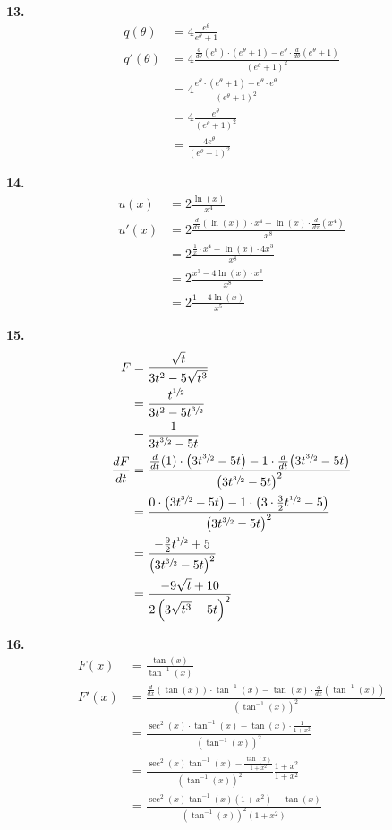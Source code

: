 \documentclass[10pt,oneside,]{book}
\theoremstyle{plain}
\theoremstyle{definition}
\numberwithin{equation}{section}
\newcommand{\fe}[2]{#1\mathopen{}\left(#2\right)\mathclose{}}
\newcommand{\fd}[1]{#1'}
\newcommand{\lz}[2]{\frac{d#1}{d#2}}
\newcommand{\lzoo}[2]{{\frac{d}{d#1}}{\left(#2\right)}}
\begin{document}
\par\smallskip
\noindent\textbf{13.}\quad{}\begin{align*}
\fe{q}{\theta}&=4\frac{e^{\theta}}{e^\theta+1}\\
\fe{\fd{q}}{\theta}&=4\frac{\lzoo{\theta}{e^{\theta}}\cdot\left(e^\theta+1\right)-e^{\theta}\cdot\lzoo{\theta}{e^\theta+1}}{\left(e^\theta+1\right)^2}\\
&=4\frac{e^{\theta}\cdot\left(e^\theta+1\right)-e^{\theta}\cdot e^\theta}{\left(e^\theta+1\right)^2}\\
&=4\frac{e^{\theta}}{\left(e^\theta+1\right)^2}\\
&=\frac{4e^{\theta}}{\left(e^\theta+1\right)^2}
\end{align*}%
\par\smallskip
\noindent\textbf{14.}\quad{}\begin{align*}
\fe{u}{x}&=2\frac{\fe{\ln}{x}}{x^4}\\
\fe{\fd{u}}{x}&=2\frac{\lzoo{x}{\fe{\ln}{x}}\cdot x^4-\fe{\ln}{x}\cdot\lzoo{x}{x^4}}{x^8}\\
&=2\frac{\frac{1}{x}\cdot x^4-\fe{\ln}{x}\cdot4x^3}{x^8}\\
&=2\frac{x^3-4\fe{\ln}{x}\cdot x^3}{x^8}\\
&=2\frac{1-4\fe{\ln}{x}}{x^5}
\end{align*}%
\par\smallskip
\noindent\textbf{15.}\quad{}\begin{align*}
F&=\frac{\sqrt{t}}{3t^2-5\sqrt{t^3}}\\
&=\frac{t^{\sfrac{1}{2}}}{3t^2-5t^{\sfrac{3}{2}}}\\
&=\frac{1}{3t^{\sfrac{3}{2}}-5t}\\
\lz{F}{t}&=\frac{\lzoo{t}{1}\cdot \left(3t^{\sfrac{3}{2}}-5t\right)-1\cdot\lzoo{t}{3t^{\sfrac{3}{2}}-5t}}{\left(3t^{\sfrac{3}{2}}-5t\right)^2}\\
&=\frac{0\cdot \left(3t^{\sfrac{3}{2}}-5t\right)-1\cdot\left(3\cdot\frac{3}{2}t^{\sfrac{1}{2}}-5\right)}{\left(3t^{\sfrac{3}{2}}-5t\right)^2}\\
&=\frac{-\frac{9}{2}t^{\sfrac{1}{2}}+5}{\left(3t^{\sfrac{3}{2}}-5t\right)^2}\\
&=\frac{-9\sqrt{t}+10}{2\left(3\sqrt{t^3}-5t\right)^2}
\end{align*}%
\par\smallskip
\noindent\textbf{16.}\quad{}\begin{align*}
\fe{F}{x}&=\frac{\fe{\tan}{x}}{\fe{\tan^{-1}}{x}}\\
\fe{\fd{F}}{x}&=\frac{\lzoo{x}{\fe{\tan}{x}}\cdot \fe{\tan^{-1}}{x}-\fe{\tan}{x}\cdot\lzoo{x}{\fe{\tan^{-1}}{x}}}{\left(\fe{\tan^{-1}}{x}\right)^2}\\
&=\frac{\fe{\sec^2}{x}\cdot \fe{\tan^{-1}}{x}-\fe{\tan}{x}\cdot\frac{1}{1+x^2}}{\left(\fe{\tan^{-1}}{x}\right)^2}\\
&=\frac{\fe{\sec^2}{x}\fe{\tan^{-1}}{x}-\frac{\fe{\tan}{x}}{1+x^2}}{\left(\fe{\tan^{-1}}{x}\right)^2}\frac{1+x^2}{1+x^2}\\
&=\frac{\fe{\sec^2}{x}\fe{\tan^{-1}}{x}\left(1+x^2\right)-\fe{\tan}{x}}{\left(\fe{\tan^{-1}}{x}\right)^2\left(1+x^2\right)}
\end{align*}%
\end{document}
